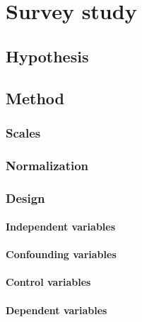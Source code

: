 \chapter{Survey study}
\label{sec:survey}

\section{Hypothesis}

\section{Method}
\subsection{Scales}

\subsection{Normalization}

\subsection{Design}
\subsubsection{Independent variables}
\subsubsection{Confounding variables}
\subsubsection{Control variables}
\subsubsection{Dependent variables}

